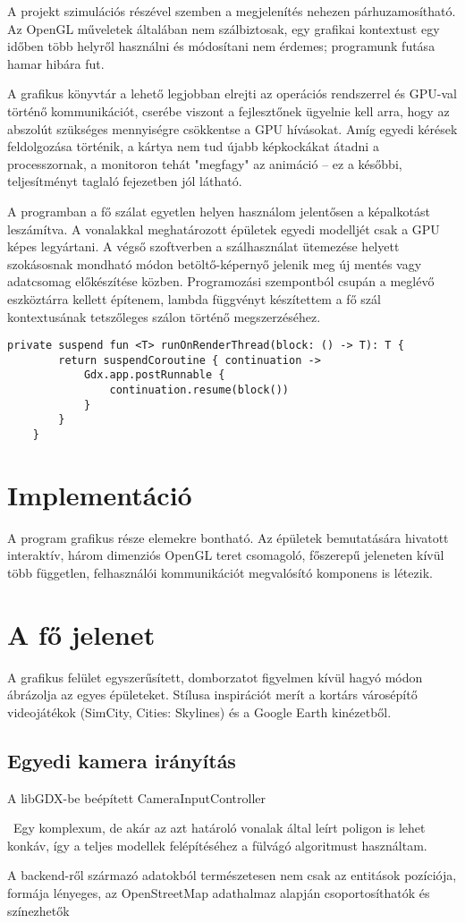 A projekt szimulációs részével szemben a megjelenítés nehezen párhuzamosítható. Az OpenGL műveletek általában nem szálbiztosak, egy grafikai kontextust egy időben több helyről használni és módosítani nem érdemes; programunk futása hamar hibára fut.

A grafikus könyvtár a lehető legjobban elrejti az operációs rendszerrel és GPU-val történő kommunikációt, cserébe viszont a fejlesztőnek ügyelnie kell arra, hogy az abszolút szükséges mennyiségre csökkentse a GPU hívásokat. Amíg egyedi kérések feldolgozása történik, a kártya nem tud újabb képkockákat átadni a processzornak, a monitoron tehát "megfagy" az animáció -- ez a későbbi, teljesítményt taglaló fejezetben jól látható.

A programban a fő szálat egyetlen helyen használom jelentősen a képalkotást leszámítva. A vonalakkal meghatározott épületek egyedi modelljét csak a GPU képes legyártani. A végső szoftverben a szálhasználat ütemezése helyett szokásosnak mondható módon betöltő-képernyő jelenik meg új mentés vagy adatcsomag előkészítése közben. Programozási szempontból csupán a meglévő eszköztárra kellett építenem, lambda függvényt készítettem a fő szál kontextusának tetszőleges szálon történő megszerzéséhez.

\begin{lstlisting}[caption=A kirajzoló szál használatát segítő generikus függvény]
private suspend fun <T> runOnRenderThread(block: () -> T): T {
        return suspendCoroutine { continuation ->
            Gdx.app.postRunnable {
                continuation.resume(block())
            }
        }
    }
\end{lstlisting}

\section{Implementáció}
A program grafikus része elemekre bontható. Az épületek bemutatására hivatott interaktív, három dimenziós OpenGL teret csomagoló, főszerepű jeleneten kívül több független, felhasználói kommunikációt megvalósító komponens is létezik.

\section{A fő jelenet}
A grafikus felület egyszerűsített, domborzatot figyelmen kívül hagyó módon ábrázolja az egyes épületeket. Stílusa inspirációt merít a kortárs városépítő videojátékok (SimCity, Cities: Skylines) és a Google Earth kinézetből.

\subsection{Egyedi kamera irányítás}

A libGDX-be beépített CameraInputController 

\
 Egy komplexum, de akár az azt határoló vonalak által leírt poligon is lehet konkáv, így a teljes modellek felépítéséhez a fülvágó algoritmust használtam.

A backend-ről származó adatokból természetesen nem csak az entitások pozíciója, formája lényeges, az OpenStreetMap adathalmaz alapján csoportosíthatók és színezhetők  
